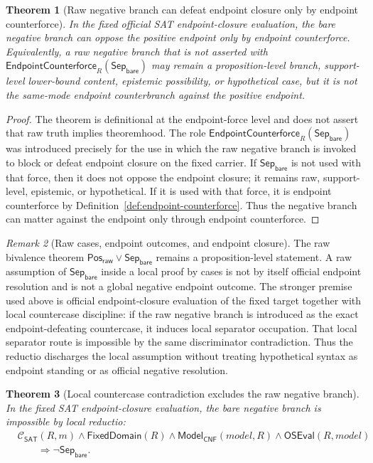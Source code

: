 \documentclass[11pt]{article}
\newtheorem{theorem}{Theorem}[section]
\theoremstyle{definition}
\theoremstyle{remark}
\newtheorem{remark}[theorem]{Remark}
\newcommand{\PosRaw}{\mathsf{Pos}_{\mathsf{raw}}}
\newcommand{\SepBare}{\mathsf{Sep}_{\mathsf{bare}}}
\newcommand{\ClayCtx}{\mathcal{C}_{\mathsf{SAT}}(R,m)}
\newcommand{\FixedDom}{\mathsf{FixedDomain}}
\newcommand{\ModelOfCnf}{\mathsf{Model}_{\mathsf{CNF}}}
\newcommand{\OfficialSATEval}{\mathsf{OSEval}}
\newcommand{\EndpointCounterforce}{\mathsf{EndpointCounterforce}}
\begin{document}
\begin{theorem}[Raw negative branch can defeat endpoint closure only by endpoint counterforce]
\label{thm:raw-negative-defeats-only-by-counterforce}
In the fixed official SAT endpoint-closure evaluation, the bare negative branch can oppose the positive endpoint only by endpoint counterforce. Equivalently, a raw negative branch that is not asserted with \(\EndpointCounterforce_R(\SepBare)\) may remain a proposition-level branch, support-level lower-bound content, epistemic possibility, or hypothetical case, but it is not the same-mode endpoint counterbranch against the positive endpoint.
\end{theorem}

\begin{proof}
The theorem is definitional at the endpoint-force level and does not assert that raw truth implies theoremhood. The role \(\EndpointCounterforce_R(\SepBare)\) was introduced precisely for the use in which the raw negative branch is invoked to block or defeat endpoint closure on the fixed carrier. If \(\SepBare\) is not used with that force, then it does not oppose the endpoint closure; it remains raw, support-level, epistemic, or hypothetical. If it is used with that force, it is endpoint counterforce by Definition~\ref{def:endpoint-counterforce}. Thus the negative branch can matter against the endpoint only through endpoint counterforce.
\end{proof}

\begin{remark}[Raw cases, endpoint outcomes, and endpoint closure]
\label{rem:raw-cases-versus-endpoint-outcomes}
The raw bivalence theorem \(\PosRaw\vee\SepBare\) remains a proposition-level statement. A raw assumption of \(\SepBare\) inside a local proof by cases is not by itself official endpoint resolution and is not a global negative endpoint outcome. The stronger premise used above is official endpoint-closure evaluation of the fixed target together with local countercase discipline: if the raw negative branch is introduced as the exact endpoint-defeating countercase, it induces local separator occupation. That local separator route is impossible by the same discriminator contradiction. Thus the reductio discharges the local assumption without treating hypothetical syntax as endpoint standing or as official negative resolution.
\end{remark}



\begin{theorem}[Local countercase contradiction excludes the raw negative branch]
\label{thm:local-countercase-contradiction-excludes-raw-negative}
In the fixed SAT endpoint-closure evaluation, the bare negative branch is impossible by local reductio:
\[
\begin{aligned}
  &\ClayCtx\wedge\FixedDom(R)\wedge\ModelOfCnf(model,R)\wedge\OfficialSATEval(R,model)\\
  &\qquad\Rightarrow \neg\SepBare.
\end{aligned}
\]
\end{theorem}
\end{document}
